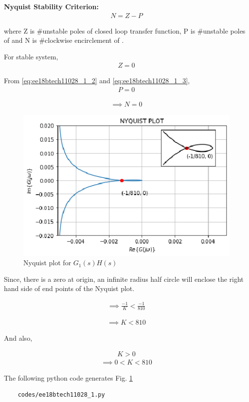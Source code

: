 \begin{enumerate}[label=\thesection.\arabic*.,ref=\thesection.\theenumi]
\textbf{Nyquist Stability Criterion:}
\begin{align}
    N = Z - P
\end{align}

where Z is \#unstable poles of closed loop transfer function, P is \#unstable poles of 
and N is \#clockwise encirclement of .

For stable system, 
\begin{align}
    Z = 0
\end{align}

From \ref{eq:ee18btech11028_1_2} and \ref{eq:ee18btech11028_1_3},
\begin{align}
    P = 0
\end{align}

\begin{align}
    \implies N = 0
\end{align}



\begin{figure}[!h]
\includegraphics[width=\columnwidth]{./figs/ee18btech11028/ee18btech11028_1.eps}
  \caption{Nyquist plot for $G_{1}(s)H(s)$}
  \label{fig:ee18btech11028_2_fig1}
\end{figure}

Since, there is a zero at origin, an infinite radius half circle will enclose the right hand side of end points of the Nyquist plot.

\begin{align}
    \implies \frac{-1}{K} < \frac{-1}{810}
\end{align}

\begin{align}
    \implies K < 810
\end{align}

And also,

\begin{align}
    K > 0
\end{align}
\begin{align}
    \implies 0 < K < 810     
\end{align}


The following python code generates  Fig. \ref{fig:ee18btech11028_2_fig1}
\begin{lstlisting}
    codes/ee18btech11028_1.py
\end{lstlisting}
\end{enumerate}